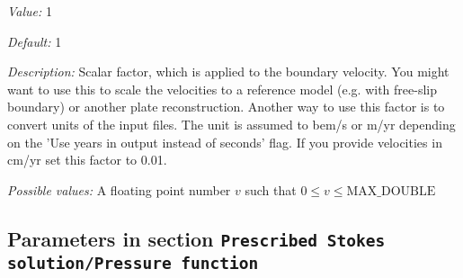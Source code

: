 \begin{itemize}
{\it Value:} 1


{\it Default:} 1


{\it Description:} Scalar factor, which is applied to the boundary velocity. You might want to use this to scale the velocities to a reference model (e.g. with free-slip boundary) or another plate reconstruction. Another way to use this factor is to convert units of the input files. The unit is assumed to bem/s or m/yr depending on the 'Use years in output instead of seconds' flag. If you provide velocities in cm/yr set this factor to 0.01.


{\it Possible values:} A floating point number $v$ such that $0 \leq v \leq \text{MAX\_DOUBLE}$
\end{itemize}

\subsection{Parameters in section \tt Prescribed Stokes solution/Pressure function}
\label{parameters:Prescribed_20Stokes_20solution/Pressure_20function}

